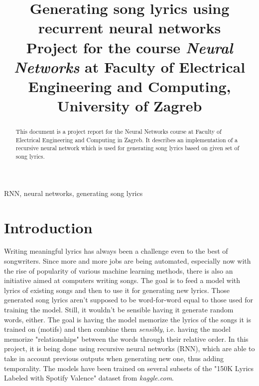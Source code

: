 \documentclass[conference]{IEEEtran}
\begin{document}
\title{Generating song lyrics using recurrent neural networks\\
{\footnotesize Project for the course \textit{Neural Networks} at Faculty of
Electrical Engineering and Computing, University of Zagreb}
}

\author{
\and
{}
\and
{}
\and
{}
\and
{}
\and
{}
}

\maketitle

\begin{abstract}
This document is a project report for the Neural Networks course at Faculty of
Electrical Engineering and Computing in Zagreb. It describes an implementation
of a recursive neural network which is used for generating song lyrics based
on given set of song lyrics.
\end{abstract}

\begin{IEEEkeywords}
RNN, neural networks, generating song lyrics
\end{IEEEkeywords}

\section{Introduction}
Writing meaningful lyrics has always been a challenge even to the best of
songwriters. Since more and more jobs are being automated, especially now with
the rise of popularity of various machine learning methods, there is also an
initiative aimed at computers writing songs.
The goal is to feed a model with lyrics of existing songs and then to use it for
generating new lyrics. Those generated song lyrics aren't supposed to be
word-for-word equal to those used for training the model. Still, it wouldn't be
sensible having it generate random words, either. The goal is having the model 
memorize the lyrics of the songs it is trained on (motifs) and then combine them
\textit{sensibly}, i.e. having the model memorize "relationships" between the
words through their relative order.
In this project, it is being done using recursive neural networks (RNN), which
are able to take in account previous outputs when generating new one, thus
adding temporality. 
The models have been trained on several subsets of the "150K Lyrics Labeled with 
Spotify Valence" dataset from \textit{kaggle.com}.
\end{document}

